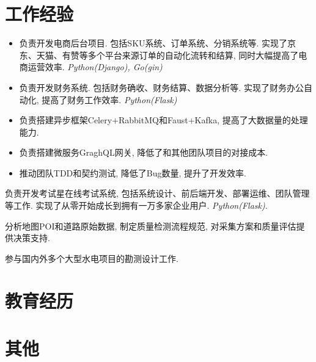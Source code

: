 \documentclass[10pt,a4paper]{moderncv}
\newcommand{\pl}[1]{\textit{\color{plblue} #1}}
\begin{document}
\section{工作经验}
{
  \begin{itemize}
    \item 负责开发电商后台项目. 包括SKU系统、订单系统、分销系统等. \newline
    实现了京东、天猫、有赞等多个平台来源订单的自动化流转和结算, 同时大幅提高了电商运营效率. \pl{Python(Django), Go(gin)}
    \item 负责开发财务系统. 包括财务确收、财务结算、数据分析等. \newline
    实现了财务办公自动化, 提高了财务工作效率. \pl{Python(Flask)}
    \item 负责搭建异步框架Celery+RabbitMQ和Faust+Kafka, 提高了大数据量的处理能力.
    \item 负责搭建微服务GraghQL网关, 降低了和其他团队项目的对接成本.
    \item 推动团队TDD和契约测试, 降低了Bug数量, 提升了开发效率.
  \end{itemize}
}

{
  负责开发考试星在线考试系统, 包括系统设计、前后端开发、部署运维、团队管理等工作. \newline
  实现了从零开始成长到拥有一万多家企业用户. \pl{Python(Flask)}.
}

{
  分析地图POI和道路原始数据, 制定质量检测流程规范, 对采集方案和质量评估提供决策支持.
}

{
  参与国内外多个大型水电项目的勘测设计工作.
}

\section{教育经历}
{}

\section{其他}
\end{document}
